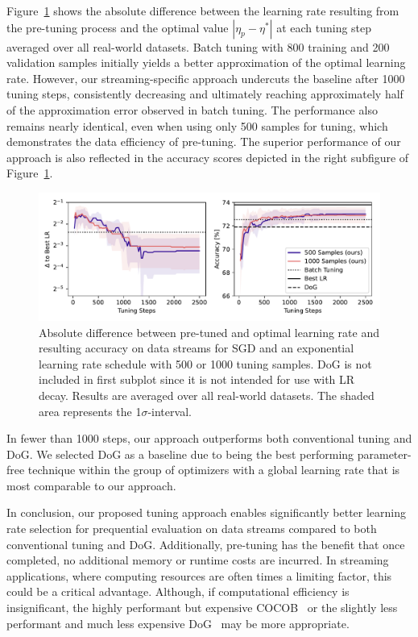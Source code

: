 \documentclass{article} %
\begin{document}
Figure~\ref{fig:pretune_lr_accuracy} shows the absolute difference between the learning rate resulting from the pre-tuning process and the optimal value $|\eta_p - \eta^*|$ at each tuning step averaged over all real-world datasets.
Batch tuning with 800 training and 200 validation samples initially yields a better approximation of the optimal learning rate. However, our streaming-specific approach undercuts the baseline after 1000 tuning steps, consistently decreasing and ultimately reaching approximately half of the approximation error observed in batch tuning.
The performance also remains nearly identical, even when using only 500 samples for tuning, which demonstrates the data efficiency of pre-tuning.
The superior performance of our approach is also reflected in the accuracy scores depicted in the right subfigure of Figure~\ref{fig:pretune_lr_accuracy}.
\begin{figure}[hb]
   \centering
   \includegraphics[width=\textwidth]{figures/pretune_1x64_acc_lr_exp_schedule.pdf}
   \caption{Absolute difference between pre-tuned and optimal learning rate and resulting accuracy on data streams for SGD and an exponential learning rate schedule with 500 or 1000 tuning samples. DoG is not included in first subplot since it is not intended for use with LR decay. Results are averaged over all real-world datasets. The shaded area represents the 1$\sigma$-interval.}\label{fig:pretune_lr_accuracy}
\end{figure}
In fewer than 1000 steps, our approach outperforms both conventional tuning and DoG.
We selected DoG as a baseline due to being the best performing parameter-free technique within the group of optimizers with a global learning rate that is most comparable to our approach.

In conclusion, our proposed tuning approach enables significantly better learning rate selection for prequential evaluation on data streams compared to both conventional tuning and DoG.
Additionally, pre-tuning has the benefit that once completed, no additional memory or runtime costs are incurred.
In streaming applications, where computing resources are often times a limiting factor, this could be a critical advantage.
Although, if computational efficiency is insignificant, the highly performant but expensive COCOB~\citep{orabonaTrainingDeepNetworks2017} or the slightly less performant and much less expensive DoG~\citep{ivgiDoGSGDBest2023} may be more appropriate.
\end{document}

